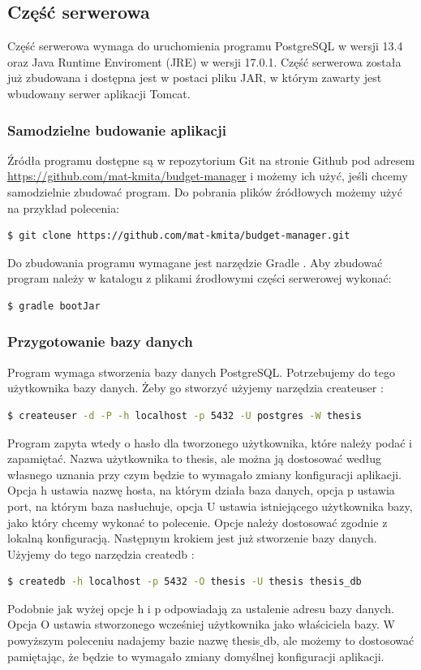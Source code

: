 \documentclass[shortabstract,inz]{iithesis}
\begin{document}
\subsection*{Część serwerowa}
Część serwerowa wymaga do uruchomienia programu PostgreSQL \citep{pgsql} w wersji 13.4 oraz Java Runtime Enviroment (JRE) \citep{java} w wersji 17.0.1.
Część serwerowa została już zbudowana i dostępna jest w postaci pliku JAR, w którym zawarty jest wbudowany serwer aplikacji Tomcat.

\subsubsection*{Samodzielne budowanie aplikacji}
Źródła programu dostępne są w repozytorium Git \citep{git} na stronie Github \citep{github} pod adresem \url{https://github.com/mat-kmita/budget-manager} i możemy ich użyć, jeśli chcemy samodzielnie zbudować program.
\noindent Do pobrania plików źródłowych możemy użyć na przykład polecenia:
\begin{lstlisting}[language=bash]
  $ git clone https://github.com/mat-kmita/budget-manager.git
\end{lstlisting}
Do zbudowania programu wymagane jest narzędzie Gradle \citep{gradle}.
\noindend Aby zbudować program należy w katalogu  z plikami źrodłowymi części serwerowej wykonać:
\begin{lstlisting}[language=bash]
  $ gradle bootJar
\end{lstlisting}

\subsubsection*{Przygotowanie bazy danych}
Program wymaga stworzenia bazy danych PostgreSQL. Potrzebujemy do tego użytkownika bazy danych.
\noindend  Żeby go stworzyć użyjemy narzędzia createuser \citep{pgsql-createuser}:
\begin{lstlisting}[language=bash]
  $ createuser -d -P -h localhost -p 5432 -U postgres -W thesis
\end{lstlisting}
Program zapyta wtedy o hasło dla tworzonego użytkownika, które należy podać i zapamiętać. Nazwa użytkownika to thesis, ale można ją dostosować według własnego uznania przy czym będzie to wymagało zmiany konfiguracji aplikacji. Opcja h ustawia nazwę hosta, na którym działa baza danych, opcja p ustawia port, na którym baza nasłuchuje, opcja U ustawia istniejącego użytkownika bazy, jako który chcemy wykonać to polecenie. Opcje należy dostosować zgodnie z lokalną konfiguracją.
Następnym krokiem jest już stworzenie bazy danych.
\noindend  Użyjemy do tego narzędzia createdb \citep{pgsql-createdb}:
\begin{lstlisting}[language=bash]
  $ createdb -h localhost -p 5432 -O thesis -U thesis thesis_db    
\end{lstlisting}
Podobnie jak wyżej opcje h i p odpowiadają za ustalenie adresu bazy danych. Opcja O ustawia stworzonego wcześniej użytkownika jako właściciela bazy. W powyższym poleceniu nadajemy bazie nazwę thesis$\_$db, ale możemy to dostosować pamiętając, że będzie to wymagało zmiany domyślnej konfiguracji aplikacji.
\end{document}
